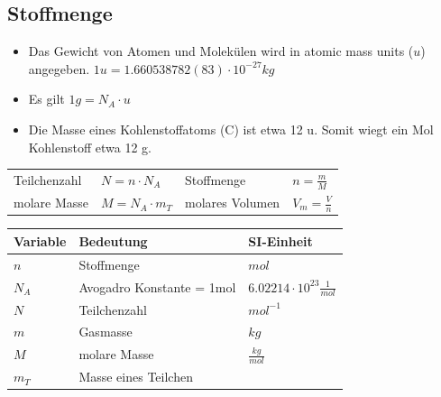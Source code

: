 \documentclass[
a4paper,
oneside,
landscape, 
8pt,
]{scrartcl}
\begin{document}
\begin{multicols*}{2}
\subsection{Stoffmenge}
\begin{itemize}
	\item Das Gewicht von Atomen und Molekülen wird in atomic mass units ($u$) angegeben. $1u = 1.660538782(83) \cdot 10^{-27}kg$
	\item Es gilt $1g = N_A \cdot u$
	\item Die Masse eines Kohlenstoffatoms (C) ist etwa 12 u. Somit wiegt ein Mol Kohlenstoff etwa 12 g.
\end{itemize}
\begin{tabbing}
	\begin{tabu} to \linewidth {l X l X}
		\toprule
		Teilchenzahl & $N = n \cdot N_A$  &
		Stoffmenge & $n = \frac{m}{M}$  \\
		molare Masse & $M = N_A \cdot m_T$ &
		molares Volumen & $V_m = \frac{V}{n}$ \\
	\end{tabu}
\end{tabbing}
\begin{tabbing}
	\begin{tabu} to \linewidth {l X l}
		Variable & Bedeutung & SI-Einheit \\
		\midrule
		$n$ & Stoffmenge & $mol$ \\
		$N_A$ & Avogadro Konstante = 1mol & $6.02214 \cdot 10^{23} \frac{1}{mol}$  \\
		$N$ & Teilchenzahl & $mol^{-1}$ \\
		$m$ & Gasmasse & $kg$ \\
		$M$ & molare Masse & $\frac{kg}{mol}$\\
		$m_T$ & Masse eines Teilchen & \\
		\bottomrule
	\end{tabu}
\end{tabbing}


\clearpage


\end{multicols*}
\end{document}
